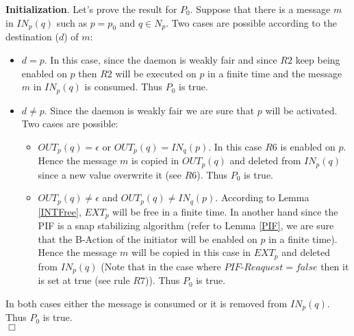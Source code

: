 \documentclass{llncs}
\renewenvironment{proof}{{\it Proof. } }{{\hfill $\Box$}\vspace{.5pc}}
\begin{document}
\begin{proof}
\textbf{Initialization}. Let's prove the result for $P_{0}$. Suppose that there is a message $m$ in $IN_{p}(q)$ such as $p=p_{0}$ and $q \in N_{p}$. Two cases are possible according to the destination ($d$) of $m$:
\begin{itemize}
\item{$d=p$. In this case, since the daemon is weakly fair and since $R2$ keep being enabled on $p$ then $R2$ will be executed on $p$ in a finite time and the message $m$ in $IN_{p}(q)$ is consumed. Thus $P_{0}$ is true.}
 \item{$d\ne p$}. Since the daemon is weakly fair we are sure that $p$ will be activated. Two cases are possible:
 \begin{itemize}
\item{$OUT_{p}(q)=\epsilon$ or $OUT_{p}(q)=IN_{q}(p)$}. In this case $R6$ is enabled on $p$. Hence the message $m$ is copied in $OUT_{p}(q)$ and deleted from $IN_{p}(q)$ since a new value overwrite it (see $R6$). Thus $P_{0}$ is true.
\item{$OUT_{p}(q) \ne \epsilon$ and $OUT_{p}(q) \ne IN_{q}(p)$}. According to Lemma \ref{INTFree}, $EXT_{p}$ will be free in a finite time. In another hand since the PIF is a snap stabilizing algorithm (refer to Lemma \ref{PIF}, we are sure that the B-Action of the initiator will be enabled on $p$ in a finite time). Hence the message $m$ will be copied in this case in $EXT_{p}$ and deleted from $IN_{p}(q)$ (Note that in the case where $PIF\mbox{-}Reaquest= false$ then it is set at true (see rule $R7$)). Thus $P_{0}$ is true.
\end{itemize}
 
\end{itemize}
 
In both cases either the message is consumed or it is removed from $IN_{p}(q)$. Thus $P_{0}$ is true.\\ 


\end{proof}
\end{document}
